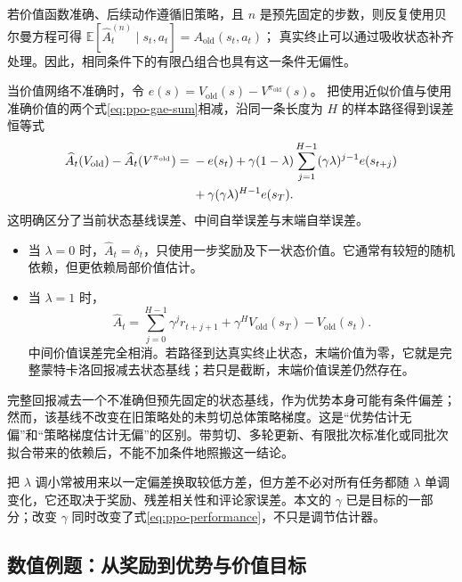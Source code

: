 \documentclass[UTF8]{ctexart}
\begin{document}
若价值函数准确、后续动作遵循旧策略，且 $n$ 是预先固定的步数，则反复使用贝尔曼方程可得
$\mathbb E[\widehat A_t^{(n)}\mid s_t,a_t]=A_{\mathrm{old}}(s_t,a_t)$；
真实终止可以通过吸收状态补齐处理。因此，相同条件下的有限凸组合也具有这一条件无偏性。

当价值网络不准确时，令
$e(s)=V_{\mathrm{old}}(s)-V^{\pi_{\mathrm{old}}}(s)$。
把使用近似价值与使用准确价值的两个式\eqref{eq:ppo-gae-sum}相减，沿同一条长度为 $H$ 的样本路径得到误差恒等式
\begin{align}
  \widehat A_t(V_{\mathrm{old}})
  -\widehat A_t(V^{\pi_{\mathrm{old}}})
  ={}&-e(s_t)
  +\gamma(1-\lambda)
    \sum_{j=1}^{H-1}(\gamma\lambda)^{j-1}e(s_{t+j})
  \notag\\
  &+\gamma(\gamma\lambda)^{H-1}e(s_T).
  \label{eq:ppo-gae-value-error}
\end{align}
这明确区分了当前状态基线误差、中间自举误差与末端自举误差。

\begin{itemize}
  \item 当 $\lambda=0$ 时，$\widehat A_t=\delta_t$，只使用一步奖励及下一状态价值。它通常有较短的随机依赖，但更依赖局部价值估计。
  \item 当 $\lambda=1$ 时，
  \[
    \widehat A_t
    =\sum_{j=0}^{H-1}\gamma^j r_{t+j+1}
     +\gamma^H V_{\mathrm{old}}(s_T)
     -V_{\mathrm{old}}(s_t).
  \]
  中间价值误差完全相消。若路径到达真实终止状态，末端价值为零，它就是完整蒙特卡洛回报减去状态基线；若只是截断，末端价值误差仍然存在。
\end{itemize}

完整回报减去一个不准确但预先固定的状态基线，作为优势本身可能有条件偏差；然而，该基线不改变在旧策略处的未剪切总体策略梯度。这是“优势估计无偏”和“策略梯度估计无偏”的区别。带剪切、多轮更新、有限批次标准化或同批次拟合带来的依赖后，不能不加条件地照搬这一结论。

把 $\lambda$ 调小常被用来以一定偏差换取较低方差，但方差不必对所有任务都随 $\lambda$ 单调变化，它还取决于奖励、残差相关性和评论家误差。本文的 $\gamma$ 已是目标的一部分；改变 $\gamma$ 同时改变了式\eqref{eq:ppo-performance}，不只是调节估计器。

\subsection{数值例题：从奖励到优势与价值目标}
\end{document}
